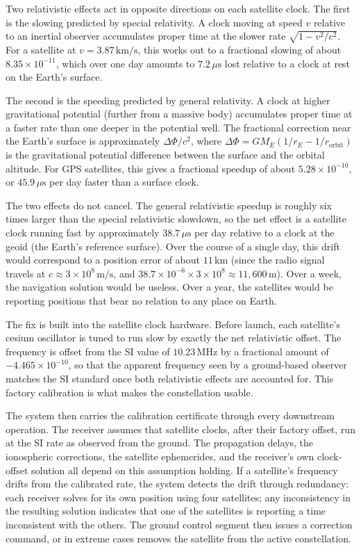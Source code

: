 Two relativistic effects act in opposite directions on each satellite clock.
The first is the slowing predicted by special relativity. A clock moving at
speed $v$ relative to an inertial observer accumulates proper time at the
slower rate $\sqrt{1 - v^2/c^2}$. For a satellite at $v = 3{.}87\,\mathrm{km/s}$,
this works out to a fractional slowing of about $8{.}35 \times 10^{-11}$,
which over one day amounts to $7{.}2\,\mu\mathrm{s}$ lost relative to a clock
at rest on the Earth's surface.

The second is the speeding predicted by general relativity. A clock at higher
gravitational potential (further from a massive body) accumulates proper time
at a faster rate than one deeper in the potential well. The fractional
correction near the Earth's surface is approximately $\Delta\Phi/c^2$, where
$\Delta\Phi = GM_E(1/r_E - 1/r_{\text{orbit}})$ is the gravitational potential
difference between the surface and the orbital altitude. For GPS satellites,
this gives a fractional speedup of about $5{.}28 \times 10^{-10}$, or
$45{.}9\,\mu\mathrm{s}$ per day faster than a surface clock.

The two effects do not cancel. The general relativistic speedup is roughly
six times larger than the special relativistic slowdown, so the net effect
is a satellite clock running fast by approximately $38{.}7\,\mu\mathrm{s}$
per day relative to a clock at the geoid (the Earth's reference surface).
Over the course of a single day, this drift would correspond to a position
error of about $11\,\mathrm{km}$ (since the radio signal travels at
$c \approx 3 \times 10^8\,\mathrm{m/s}$, and $38{.}7 \times 10^{-6} \times
3 \times 10^8 \approx 11{,}600\,\mathrm{m}$). Over a week, the navigation
solution would be useless. Over a year, the satellites would be reporting
positions that bear no relation to any place on Earth.

The fix is built into the satellite clock hardware. Before launch, each
satellite's cesium oscillator is tuned to run slow by exactly the net
relativistic offset. The frequency is offset from the SI value of
$10{.}23\,\mathrm{MHz}$ by a fractional amount of $-4{.}465 \times 10^{-10}$,
so that the apparent frequency seen by a ground-based observer matches the
SI standard once both relativistic effects are accounted for. This factory
calibration is what makes the constellation usable.

The system then carries the calibration certificate through every downstream
operation. The receiver assumes that satellite clocks, after their factory
offset, run at the SI rate as observed from the ground. The propagation
delays, the ionospheric corrections, the satellite ephemerides, and the
receiver's own clock-offset solution all depend on this assumption holding.
If a satellite's frequency drifts from the calibrated rate, the system
detects the drift through redundancy: each receiver solves for its own
position using four satellites; any inconsistency in the resulting solution
indicates that one of the satellites is reporting a time inconsistent with
the others. The ground control segment then issues a correction command, or
in extreme cases removes the satellite from the active constellation.

